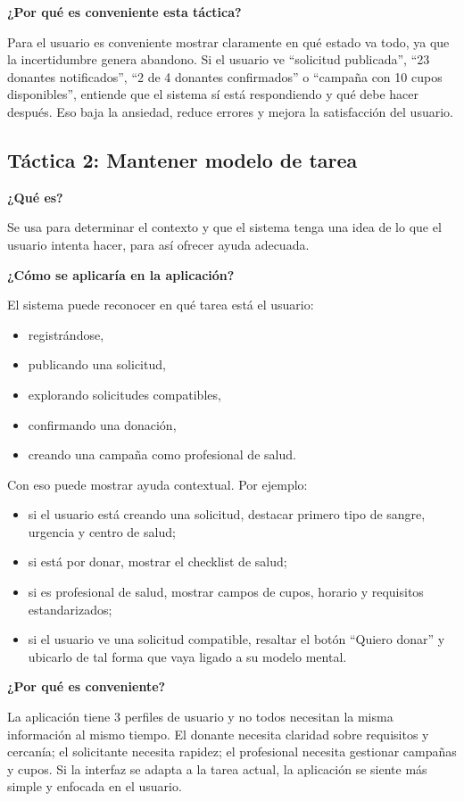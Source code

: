 \medskip
\noindent\textbf{¿Por qué es conveniente esta táctica?}

Para el usuario es conveniente mostrar claramente en qué estado va todo, ya que la incertidumbre genera abandono. Si el usuario ve ``solicitud publicada'', ``23 donantes notificados'', ``2 de 4 donantes confirmados'' o ``campaña con 10 cupos disponibles'', entiende que el sistema sí está respondiendo y qué debe hacer después. Eso baja la ansiedad, reduce errores y mejora la satisfacción del usuario.

\subsection{Táctica 2: Mantener modelo de tarea}

\noindent\textbf{¿Qué es?}

Se usa para determinar el contexto y que el sistema tenga una idea de lo que el usuario intenta hacer, para así ofrecer ayuda adecuada.

\medskip
\noindent\textbf{¿Cómo se aplicaría en la aplicación?}

El sistema puede reconocer en qué tarea está el usuario:

\begin{itemize}
    \item registrándose,
    \item publicando una solicitud,
    \item explorando solicitudes compatibles,
    \item confirmando una donación,
    \item creando una campaña como profesional de salud.
\end{itemize}

Con eso puede mostrar ayuda contextual. Por ejemplo:

\begin{itemize}
    \item si el usuario está creando una solicitud, destacar primero tipo de sangre, urgencia y centro de salud;
    \item si está por donar, mostrar el checklist de salud;
    \item si es profesional de salud, mostrar campos de cupos, horario y requisitos estandarizados;
    \item si el usuario ve una solicitud compatible, resaltar el botón ``Quiero donar'' y ubicarlo de tal forma que vaya ligado a su modelo mental.
\end{itemize}

\medskip
\noindent\textbf{¿Por qué es conveniente?}

La aplicación tiene 3 perfiles de usuario y no todos necesitan la misma información al mismo tiempo. El donante necesita claridad sobre requisitos y cercanía; el solicitante necesita rapidez; el profesional necesita gestionar campañas y cupos. Si la interfaz se adapta a la tarea actual, la aplicación se siente más simple y enfocada en el usuario.
